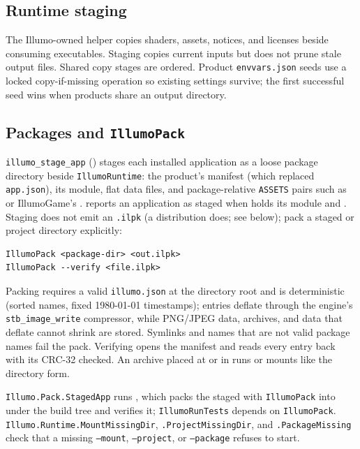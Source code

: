 \subsection{Runtime staging}
The Illumo-owned helper copies shaders, assets, notices, and licenses beside
consuming executables. Staging copies current inputs but does not prune stale
output files. Shared copy stages are ordered. Product \texttt{envvars.json}
seeds use a locked copy-if-missing operation so existing settings survive;
the first successful seed wins when products share an output directory.

\subsection{Packages and \texttt{IllumoPack}}
\texttt{illumo\_stage\_app} () stages each
installed application as a loose package directory
 beside \texttt{IllumoRuntime}: the product's
 manifest (which replaced \texttt{app.json}), its module,
flat data files, and package-relative \texttt{ASSETS} pairs such as
 or IllumoGame's
.  reports an
application as staged when  holds its module and
. Staging does not emit an \texttt{.ilpk} (a
distribution does; see below); pack a staged or project directory explicitly:
\begin{lstlisting}[language={}]
IllumoPack <package-dir> <out.ilpk>
IllumoPack --verify <file.ilpk>
\end{lstlisting}
Packing requires a valid \texttt{illumo.json} at the directory root and is
deterministic (sorted names, fixed 1980-01-01 timestamps); entries deflate
through the engine's \texttt{stb\_image\_write} compressor, while PNG/JPEG
data, archives, and data that deflate cannot shrink are stored. Symlinks and
names that are not valid package names fail the pack. Verifying opens
the manifest and reads every entry back with its CRC-32 checked. An archive
placed at  or in  runs or mounts
like the directory form.

\texttt{Illumo.Pack.StagedApp} runs ,
which packs the staged  with \texttt{IllumoPack} into
 under the build tree and verifies it;
\texttt{IllumoRunTests} depends on \texttt{IllumoPack}.
\texttt{Illumo.Runtime.MountMissingDir}, \texttt{.ProjectMissingDir}, and
\texttt{.PackageMissing} check that a missing \texttt{--mount},
\texttt{--project}, or \texttt{--package} refuses to start.


